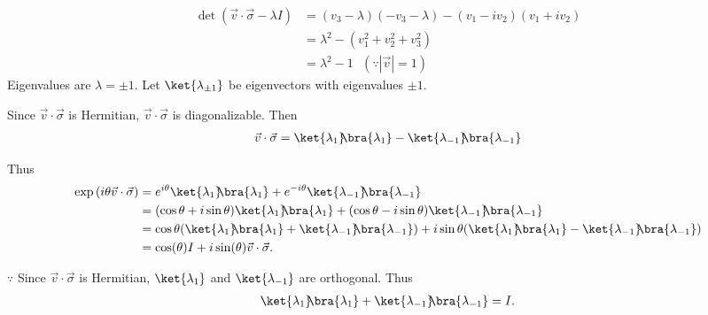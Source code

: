 \documentclass[10pt]{book}
\newcommand{\kb}[1]{\ket{#1}\hspace{-1mm} \bra{#1}} %
\begin{document}
	\begin{equation}
\begin{aligned}
		\det (\vec{v} \cdot \vec{\sigma}  - \lambda I) &= (v_3 - \lambda) (-v_3 - \lambda) - (v_1 - iv_2) (v_1 + iv_2)\\
		&= \lambda^2 - (v_1^2 + v_2^2  + v_3^2)\\
		&= \lambda^2 - 1 ~~~ (\because |\vec{v}| = 1)
	\end{aligned}
\end{equation}
	Eigenvalues are $\lambda = \pm 1$.
	Let $\ket{\lambda_{ \pm 1 } }$ be eigenvectors with eigenvalues $\pm  1$.
	
	Since $\vec{v} \cdot \vec{\sigma}$ is Hermitian,  $\vec{v} \cdot \vec{\sigma}$ is diagonalizable.
	Then
	\begin{equation}
\begin{aligned}
		\vec{v} \cdot \vec{\sigma} = \kb{\lambda_1} - \kb{\lambda_{-1}}
	\end{aligned}
\end{equation}
	
	Thus
	\begin{equation}
\begin{aligned}
		\exp \left(i \theta \vec{v} \cdot \vec{\sigma} \right) &=
		e^{i \theta} \kb{\lambda_1}  + e^{-i \theta} \kb{\lambda_{-1}}\\
		&= (\cos \theta + i \sin \theta) \kb{\lambda_1} + (\cos \theta - i \sin \theta) \kb{\lambda_{-1}}\\
		&= \cos \theta (\kb{\lambda_1} + \kb{\lambda_{-1}}) + i \sin \theta (\kb{\lambda_1} - \kb{\lambda_{-1}}) \\
		&= \cos( \theta) I + i \sin (\theta) \vec{v} \cdot \vec{\sigma}.
	\end{aligned}
\end{equation}
	
	$\because$ Since $\vec{v} \cdot \vec{\sigma}$ is Hermitian, $\ket{\lambda_1}$ and $\ket{\lambda_{-1}}$ are orthogonal.
	Thus
	\begin{equation}
\begin{aligned}
		\kb{\lambda_1} + \kb{\lambda_{-1}} = I.
	\end{aligned}
\end{equation}
	
\end{document}
